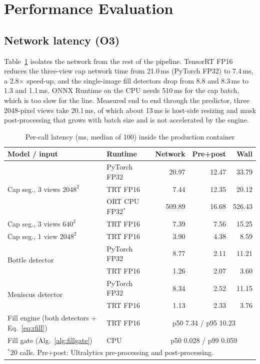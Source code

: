 \section{Performance Evaluation}
\label{sec:performance-evaluation}

\subsection{Network latency (O3)}
Table~\ref{tab:latency} isolates the network from the rest of the pipeline. TensorRT FP16 reduces the three-view cap network time from 21.0\,ms (PyTorch FP32) to 7.4\,ms, a 2.8$\times$ speed-up, and the single-image fill detectors drop from 8.8 and 8.3\,ms to 1.3 and 1.1\,ms. ONNX Runtime on the CPU needs 510\,ms for the cap batch, which is too slow for the line. Measured end to end through the predictor, three 2048-pixel views take 20.1\,ms, of which about 13\,ms is host-side resizing and mask post-processing that grows with batch size and is not accelerated by the engine.

\begin{table}[htbp]
\centering
\caption{Per-call latency (ms, median of 100) inside the production container}
\label{tab:latency}
\footnotesize
\begin{tabular}{|l|l|r|r|r|}
\hline
\textbf{Model / input} & \textbf{Runtime} & \textbf{Network} & \textbf{Pre+post} & \textbf{Wall} \\ \hline
\multirow{3}{*}{Cap seg., 3 views $2048^2$} & PyTorch FP32 & 20.97 & 12.47 & 33.79 \\ \cline{2-5}
 & TRT FP16 & 7.44 & 12.35 & 20.12 \\ \cline{2-5}
 & ORT CPU FP32$^{*}$ & 509.89 & 16.68 & 526.43 \\ \hline
Cap seg., 3 views $640^2$ & TRT FP16 & 7.39 & 7.56 & 15.25 \\ \hline
Cap seg., 1 view $2048^2$ & TRT FP16 & 3.90 & 4.38 & 8.59 \\ \hline
\multirow{2}{*}{Bottle detector} & PyTorch FP32 & 8.77 & 2.11 & 11.21 \\ \cline{2-5}
 & TRT FP16 & 1.26 & 2.07 & 3.60 \\ \hline
\multirow{2}{*}{Meniscus detector} & PyTorch FP32 & 8.34 & 2.52 & 11.15 \\ \cline{2-5}
 & TRT FP16 & 1.13 & 2.33 & 3.76 \\ \hline
Fill engine (both detectors + Eq.~\eqref{eq:rfill}) & TRT FP16 & \multicolumn{3}{c|}{p50 7.34 / p95 10.23} \\ \hline
Fill gate (Alg.~\ref{alg:fillgate}) & CPU & \multicolumn{3}{c|}{p50 0.028 / p99 0.059} \\ \hline
\multicolumn{5}{l}{\scriptsize $^{*}$20 calls. Pre+post: Ultralytics pre-processing and post-processing.}
\end{tabular}
\end{table}

